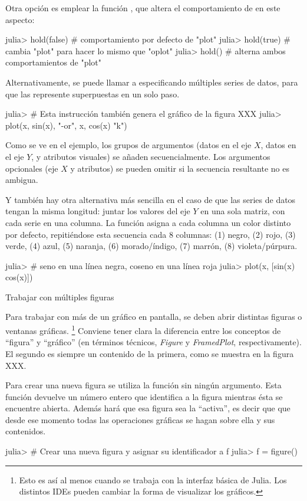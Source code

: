 ﻿\documentclass[spanish]{article}
\begin{document}
Otra opción es emplear la función , que altera el comportamiento de  en este aspecto:

julia> hold(false) # comportamiento por defecto de "plot"
julia> hold(true)  # cambia "plot" para hacer lo mismo que "oplot"
julia> hold()      # alterna ambos comportamientos de "plot"

Alternativamente, se puede llamar a  especificando múltiples series de datos, para que las represente superpuestas en un solo paso.

julia> # Esta instrucción también genera el gráfico de la figura XXX
julia> plot(x, sin(x), "-or", x, cos(x) "k")

Como se ve en el ejemplo, los grupos de argumentos (datos en el eje $X$, datos en el eje $Y$, y atributos visuales) se añaden secuencialmente. Los argumentos opcionales (eje $X$ y atributos) se pueden omitir si la secuencia resultante no es ambigua.

Y también hay otra alternativa más sencilla en el caso de que las series de datos tengan la misma longitud: juntar los valores del eje $Y$ en una sola matriz, con cada serie en una columna. La función  asigna a cada columna un color distinto por defecto, repitiéndose esta secuencia cada 8 columnas: (1) negro, (2) rojo, (3) verde, (4) azul, (5) naranja, (6) morado/índigo, (7) marrón, (8) violeta/púrpura.

julia> # seno en una línea negra, coseno en una línea roja
julia> plot(x, [sin(x) cos(x)])


Trabajar con múltiples figuras

Para trabajar con más de un gráfico en pantalla, se deben abrir distintas figuras o ventanas gráficas.%
\footnote{%
Esto es así al menos cuando se trabaja con la interfaz básica de Julia. Los distintos IDEs pueden cambiar la forma de visualizar los gráficos.%
}
Conviene tener clara la diferencia entre los conceptos de ``figura'' y ``gráfico'' (en términos técnicos, \emph{Figure} y \emph{FramedPlot}, respectivamente). El segundo es siempre un contenido de la primera, como se muestra en la figura XXX.

Para crear una nueva figura se utiliza la función  sin ningún argumento. Esta función devuelve un número entero que identifica a la figura mientras ésta se encuentre abierta. Además hará que esa figura sea la ``activa'', es decir que que desde ese momento todas las operaciones gráficas se hagan sobre ella y sus contenidos.

julia> # Crear una nueva figura y asignar su identificador a f
julia> f = figure()
\end{document}
